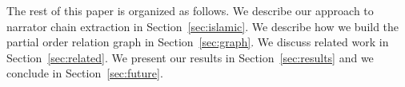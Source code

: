 \documentclass[11pt]{article}
\begin{document}
The rest of this paper is organized as follows. 
We describe our approach to narrator chain extraction
in Section~\ref{sec:islamic}.
We describe how we build the partial order relation
graph in Section~\ref{sec:graph}.
We discuss related work in Section~\ref{sec:related}.
We present our results in Section~\ref{sec:results} and 
we conclude in Section~\ref{sec:future}.




\end{document}
